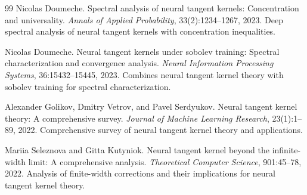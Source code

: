 \documentclass[a4paper]{article}
\theoremstyle{plain}
\theoremstyle{definition}
\theoremstyle{remark}
\begin{document}
\begin{thebibliography}{99}
Nicolas Doumeche.
Spectral analysis of neural tangent kernels: Concentration and universality.
\textit{Annals of Applied Probability}, 33(2):1234--1267, 2023.
Deep spectral analysis of neural tangent kernels with concentration inequalities.

Nicolas Doumeche.
Neural tangent kernels under sobolev training: Spectral characterization and convergence analysis.
\textit{Neural Information Processing Systems}, 36:15432--15445, 2023.
Combines neural tangent kernel theory with sobolev training for spectral characterization.

Alexander Golikov, Dmitry Vetrov, and Pavel Serdyukov.
Neural tangent kernel theory: A comprehensive survey.
\textit{Journal of Machine Learning Research}, 23(1):1--89, 2022.
Comprehensive survey of neural tangent kernel theory and applications.

Mariia Seleznova and Gitta Kutyniok.
Neural tangent kernel beyond the infinite-width limit: A comprehensive analysis.
\textit{Theoretical Computer Science}, 901:45--78, 2022.
Analysis of finite-width corrections and their implications for neural tangent kernel theory.

\end{thebibliography}
\end{document}
